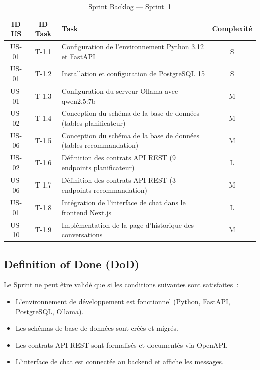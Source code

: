 \begin{table}[H]
    \centering
    \caption{Sprint Backlog --- Sprint~1}
    \label{tab:sprint1_backlog}
    \small
    \begin{tabular}{c c p{7cm} c}
        \toprule
        \textbf{ID US} & \textbf{ID Task} & \textbf{Task} & \textbf{Complexité} \\
        \midrule
        US-01 & T-1.1 & Configuration de l'environnement Python 3.12 et FastAPI & S \\[3pt]
        US-01 & T-1.2 & Installation et configuration de PostgreSQL 15 & S \\[3pt]
        US-01 & T-1.3 & Configuration du serveur Ollama avec qwen2.5:7b & M \\[3pt]
        US-02 & T-1.4 & Conception du schéma de la base de données (tables planificateur) & M \\[3pt]
        US-06 & T-1.5 & Conception du schéma de la base de données (tables recommandation) & M \\[3pt]
        US-02 & T-1.6 & Définition des contrats API REST (9 endpoints planificateur) & L \\[3pt]
        US-06 & T-1.7 & Définition des contrats API REST (3 endpoints recommandation) & M \\[3pt]
        US-01 & T-1.8 & Intégration de l'interface de chat dans le frontend Next.js & L \\[3pt]
        US-10 & T-1.9 & Implémentation de la page d'historique des conversations & M \\
        \bottomrule
    \end{tabular}
\end{table}

\subsection{Definition of Done (DoD)}

Le Sprint ne peut être validé que si les conditions suivantes sont satisfaites~:
\begin{itemize}
    \item L'environnement de développement est fonctionnel (Python, FastAPI, PostgreSQL, Ollama).
    \item Les schémas de base de données sont créés et migrés.
    \item Les contrats API REST sont formalisés et documentés via OpenAPI.
    \item L'interface de chat est connectée au backend et affiche les messages.
\end{itemize}


